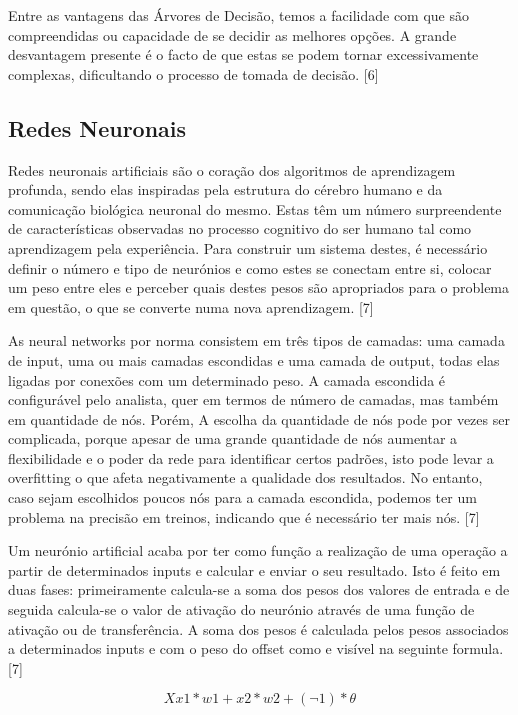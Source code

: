 Entre as vantagens das Árvores de Decisão, temos a facilidade com que são compreendidas ou capacidade de se decidir as melhores opções. A grande desvantagem presente é o facto de que estas se podem tornar excessivamente complexas, dificultando o processo de tomada de decisão. [6]

\subsection{Redes Neuronais}

Redes neuronais artificiais são o coração dos algoritmos de aprendizagem profunda, sendo elas inspiradas pela estrutura do cérebro humano e da comunicação biológica neuronal do mesmo. Estas têm um número surpreendente de características observadas no processo cognitivo do ser humano tal como aprendizagem pela experiência. Para construir um sistema destes, é necessário definir o número e tipo de neurónios e como estes se conectam entre si, colocar um peso entre eles e perceber quais destes pesos são apropriados para o problema em questão, o que se converte numa nova aprendizagem. [7]

As neural networks por norma consistem em três tipos de camadas: uma camada de input, uma ou mais camadas escondidas e uma camada de output, todas elas ligadas por
conexões com um determinado peso. A camada escondida é configurável pelo analista, quer em termos de número de camadas, mas também em quantidade de nós. Porém, A escolha da quantidade de nós pode por vezes ser complicada, porque apesar de uma grande quantidade de nós aumentar a flexibilidade e o poder da rede para identificar certos padrões, isto pode levar a overfitting o que afeta negativamente a
qualidade dos resultados. No entanto, caso sejam escolhidos poucos nós para a camada escondida, podemos ter um problema na precisão em treinos, indicando que é necessário ter mais nós. [7]

Um neurónio artificial acaba por ter como função a realização de uma operação a partir de determinados inputs e calcular e enviar o seu resultado. Isto é feito em duas fases: primeiramente calcula-se a soma dos pesos dos valores de entrada e de seguida calcula-se o valor de ativação do neurónio através de uma função de ativação ou de transferência. A soma dos pesos é calculada pelos pesos associados a determinados inputs e com o peso do offset como e visível na seguinte formula. [7]

\begin{center}
    {$$Xx1 \ast w1 + x2 \ast w2 + (\neg1) \ast \theta$$}
\end{center}

